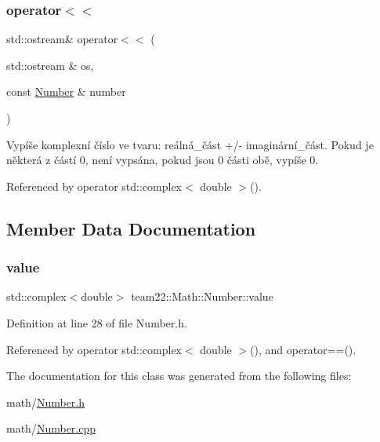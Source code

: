 \subsubsection{\texorpdfstring{operator$<$$<$}{operator<<}}
{\footnotesize\ttfamily std\+::ostream\& operator$<$$<$ (\begin{DoxyParamCaption}\item[{std\+::ostream \&}]{os,  }\item[{const \hyperlink{classteam22_1_1_math_1_1_number}{Number} \&}]{number }\end{DoxyParamCaption})\hspace{0.3cm}{\ttfamily [friend]}}

Vypíše komplexní číslo ve tvaru\+: reálná\+\_\+část +/-\/ imaginární\+\_\+část. Pokud je některá z částí 0, není vypsána, pokud jsou 0 části obě, vypíše 0. 

Referenced by operator std\+::complex$<$ double $>$().



\subsection{Member Data Documentation}
\mbox{\label{classteam22_1_1_math_1_1_number_a596bb514d860fbbcec3f114c3f73a59b}} 
\subsubsection{\texorpdfstring{value}{value}}
{\footnotesize\ttfamily std\+::complex$<$double$>$ team22\+::\+Math\+::\+Number\+::value\hspace{0.3cm}{\ttfamily [private]}}



Definition at line 28 of file Number.\+h.



Referenced by operator std\+::complex$<$ double $>$(), and operator==().



The documentation for this class was generated from the following files\+:\begin{DoxyCompactItemize}
\item 
math/\hyperlink{_number_8h}{Number.\+h}\item 
math/\hyperlink{_number_8cpp}{Number.\+cpp}\end{DoxyCompactItemize}
